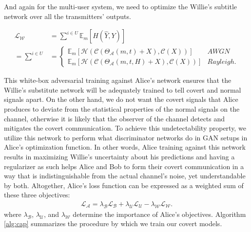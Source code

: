 And again for the multi-user system, we need to optimize the Willie's subtitle network over all the transmitters' outputs.

\begin{equation}
	\begin{aligned} \label{multi_willie_loss}
		\mathcal{L}_{\mathcal{W}} & = 
		\sum^{i \in U} \mathbb{E}_{m}[H(\hat{Y}, Y)] \\
		= \sum^{i \in U} & = \begin{cases}
			\mathbb{E}_{m}[\mathcal{H}(\mathcal{C}(\Theta_{\mathcal{A}}(m, t) + X), \mathcal{C}(X))] & AWGN \\
			\mathbb{E}_{m}[\mathcal{H}(\mathcal{C}(\Theta_{\mathcal{A}}(m, t, H) + X), \mathcal{C}(X))] & Rayleigh.
		\end{cases}
	\end{aligned}
\end{equation}

This white-box adversarial training against Alice's network ensures that the Willie's substitute network will be adequately trained to tell covert and normal signals apart. On the other hand, we do not want the covert signals that Alice produces to deviate from the statistical properties of the normal signals on the channel, otherwise it is likely that the observer of the channel detects and mitigates the covert communication. To achieve this undetectability property, we utilize this network to perform what discriminator networks do in GAN setups in Alice's optimization function. In other words, Alice training against this network results in maximizing Willie's uncertainty about his predictions and having a regularizer as such helps Alice and Bob to form their covert communication in a way that is indistinguishable from the actual channel's noise, yet understandable by both. Altogether, Alice's loss function can be expressed as a weighted sum of these three objectives:
\begin{equation}
	\begin{array}{l} \label{alice_loss}
	\mathcal{L}_{\mathcal{A}} = \lambda_{\mathcal{B}} \mathcal{L}_{\mathcal{B}} + \lambda_{\mathcal{U}} \mathcal{L}_{\mathcal{U}} - \lambda_{\mathcal{W}} \mathcal{L}_{\mathcal{W}}.
\end{array}
\end{equation}
where \(\lambda_{\mathcal{B}}\), \(\lambda_{\mathcal{U}}\), and \(\lambda_{\mathcal{W}}\) determine the importance of Alice's objectives. Algorithm \ref{alg:cap} summarizes the procedure by which we train our covert models.

